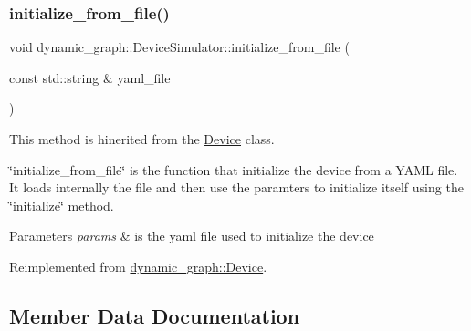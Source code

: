 \mbox{\label{classdynamic__graph_1_1DeviceSimulator_a8a9370f236ba03162be2472c79f865f2}} 
\subsubsection{\texorpdfstring{initialize\+\_\+from\+\_\+file()}{initialize\_from\_file()}}
{\footnotesize\ttfamily void dynamic\+\_\+graph\+::\+Device\+Simulator\+::initialize\+\_\+from\+\_\+file (\begin{DoxyParamCaption}\item[{const std\+::string \&}]{yaml\+\_\+file }\end{DoxyParamCaption})\hspace{0.3cm}{\ttfamily [virtual]}}



This method is hinerited from the \hyperlink{classdynamic__graph_1_1Device}{Device} class. 

\char`\"{}initialize\+\_\+from\+\_\+file\char`\"{} is the function that initialize the device from a Y\+A\+ML file. It loads internally the file and then use the paramters to initialize itself using the \char`\"{}initialize\char`\"{} method. 
\begin{DoxyParams}{Parameters}
{\em params} & is the yaml file used to initialize the device \\
\hline
\end{DoxyParams}


Reimplemented from \hyperlink{classdynamic__graph_1_1Device_af71d151e69555e9530d770d3d90b7f3e}{dynamic\+\_\+graph\+::\+Device}.



\subsection{Member Data Documentation}
\mbox{\label{classdynamic__graph_1_1DeviceSimulator_abbbcc26f173788b15a395ff87f3925e1}} 
